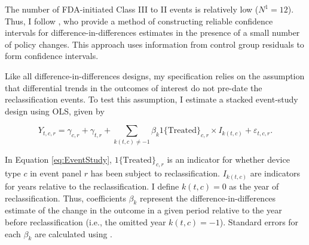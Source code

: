 \documentclass[letterpaper,12pt]{article}
\theoremstyle{definition}
\begin{document}
The number of FDA-initiated Class III to II events is relatively low ($N^1=12$). Thus, I follow \citet{conley2011inference}, who provide a method of constructing reliable confidence intervals for difference-in-differences estimates in the presence of a small number of policy changes. This approach uses information from control group residuals to form confidence intervals.\footnotemark {}




Like all difference-in-differences designs, my specification relies on the assumption that differential trends in the outcomes of interest do not pre-date the reclassification events. To test this assumption, I estimate a stacked event-study design using OLS, given by

\begin{equation}
Y_{t,c,r}=\gamma_{c,r} + \gamma_{t,r} + \sum_{k(t,c) \not = -1} \beta_{k} 1\text{\{Treated\}}_{c,r} \times I_{k(t,c)} + \varepsilon_{t,c,r} \label{eq:EventStudy}.
\end{equation}

In Equation \ref{eq:EventStudy}, $1\text{\{Treated\}}_{c,r}$ is an indicator for whether device type $c$ in event panel $r$ has been subject to reclassification.\footnotemark {} $I_{k(t,c)}$ are indicators for years relative to the reclassification. I define $k(t,c) = 0$ as the year of reclassification. Thus, coefficients $\beta_{k}$ represent the difference-in-differences estimate of the change in the outcome in a given period relative to the year before reclassification (i.e., the omitted year $k(t,c) = -1$). Standard errors for each $\beta_{k}$ are calculated using \citet{conley2011inference}. 
\end{document}

